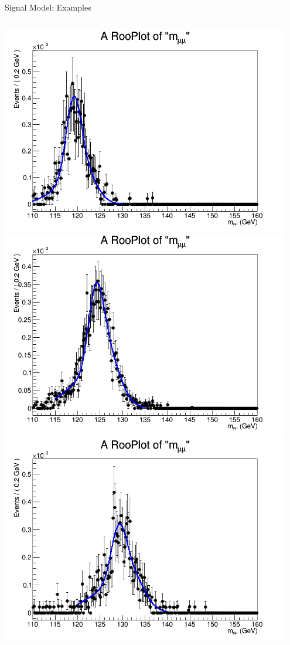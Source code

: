 \documentclass[pdf, 9pt]{beamer}
\begin{document}
\begin{frame}{Signal Model: Examples}
\begin{columns}[T]
\begin{column}{0.33\textwidth}
\begin{center}
          \includegraphics[width=0.95\textwidth, height=0.3\textheight]{figs/higgs/signalmodel/bdt/bdt_110to160_withSys/signalFit__c1__120__GluGlu__TripleGaus__default.png}\\
          \includegraphics[width=0.95\textwidth, height=0.3\textheight]{figs/higgs/signalmodel/bdt/bdt_110to160_withSys/signalFit__c1__125__GluGlu__TripleGaus__default.png}\\
          \includegraphics[width=0.95\textwidth, height=0.3\textheight]{figs/higgs/signalmodel/bdt/bdt_110to160_withSys/signalFit__c1__130__GluGlu__TripleGaus__default.png}

\end{center}
\end{column}
\end{columns}
\end{frame}
\end{document}
